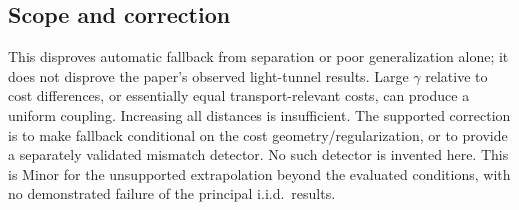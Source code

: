 \documentclass[10pt]{article}
\begin{document}
\subsection*{Scope and correction}
This disproves automatic fallback from separation or poor generalization alone; it does not disprove the paper’s observed light-tunnel results. Large \(\gamma\) relative to cost differences, or essentially equal transport-relevant costs, can produce a uniform coupling. Increasing all distances is insufficient. The supported correction is to make fallback conditional on the cost geometry/regularization, or to provide a separately validated mismatch detector. No such detector is invented here. This is Minor for the unsupported extrapolation beyond the evaluated conditions, with no demonstrated failure of the principal i.i.d. results.\par
\end{document}
